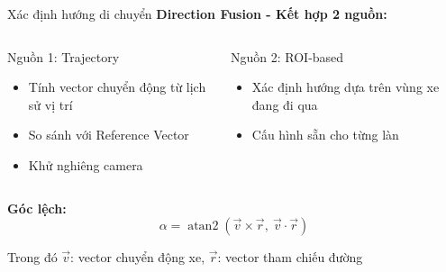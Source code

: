 \begin{frame}{Xác định hướng di chuyển}
    \textbf{Direction Fusion - Kết hợp 2 nguồn:}

    \begin{columns}
        \begin{block}{Nguồn 1: Trajectory}
        \begin{itemize}
            \item Tính vector chuyển động từ lịch sử vị trí
            \item So sánh với Reference Vector
            \item Khử nghiêng camera
        \end{itemize}
        \end{block}

        \begin{block}{Nguồn 2: ROI-based}
        \begin{itemize}
            \item Xác định hướng dựa trên vùng xe đang đi qua
            \item Cấu hình sẵn cho từng làn
        \end{itemize}
        \end{block}
    \end{columns}

    \vspace{0.5em}
    \textbf{Góc lệch:}
    $$ \alpha = \operatorname{atan2}(\vec{v} \times \vec{r}, \ \vec{v} \cdot \vec{r}) $$

    Trong đó $\vec{v}$: vector chuyển động xe, $\vec{r}$: vector tham chiếu đường
\end{frame}
